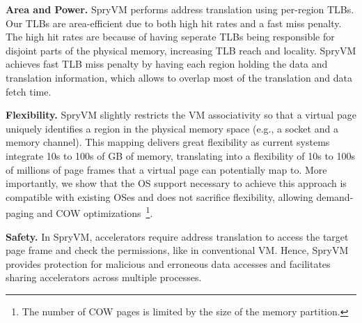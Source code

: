 \noindent\textbf{Area and Power.} SpryVM performs address translation using per-region TLBs. Our TLBs are area-efficient due to both high hit rates and a fast miss penalty. The high hit rates are because of having seperate TLBs being responsible for disjoint parts of the physical memory, increasing TLB reach and locality. SpryVM achieves fast TLB miss penalty by having each region holding the data and translation information, which allows to overlap most of the translation and data fetch time.


\noindent\textbf{Flexibility.} SpryVM slightly restricts the VM associativity so that a virtual page uniquely identifies a region in the physical memory space (e.g., a socket and a memory channel). This mapping delivers great flexibility as current systems integrate 10s to 100s of GB of memory, translating into a flexibility of 10s to 100s of millions of page frames that a virtual page can potentially map to. More importantly, we show that the OS support necessary to achieve this approach is compatible with existing OSes and does not sacrifice flexibility, allowing demand-paging and COW optimizations~\footnote{The number of COW pages is limited by the size of the memory partition.}.

\noindent\textbf{Safety.} In SpryVM, accelerators require address translation to access the target page frame and check the permissions, like in conventional VM. Hence, SpryVM provides protection for malicious and erroneous data accesses and facilitates sharing accelerators across multiple processes.

 



